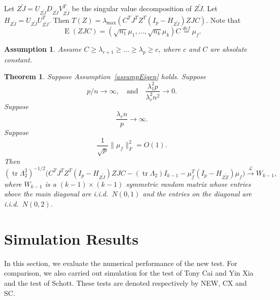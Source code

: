 \documentclass[review]{elsarticle}
\DeclareMathOperator{\mytr}{tr}
\DeclareMathOperator{\myE}{E}
\theoremstyle{plain}
\newtheorem{theorem}{\quad\quad Theorem}
\newtheorem{assumption}{\quad\quad Assumption}
\theoremstyle{definition}
\theoremstyle{remark}
\begin{document}
Let $Z\tilde{J}=U_{Z\tilde{J}}D_{Z\tilde{J}}V_{Z\tilde{J}}^T$ be the singular value decomposition of $Z\tilde{J}$. Let $H_{Z\tilde{J}}=U_{Z\tilde{J}}U_{Z\tilde{J}}^T$.
Then
$T(Z) = \lambda_{\max}(C^T J^T Z^T (I_p-H_{Z\tilde{J}})ZJC)$.
Note that
$$
\myE (ZJC) =(\sqrt{n_1}\mu_1,\ldots,\sqrt{n_k}\mu_k) C\overset{def}{=}\mu_{f}.
$$


\begin{assumption}\label{assumpEigen}
    Assume $C \geq \lambda_{r+1} \geq \ldots \geq \lambda_{p} \geq c$, where $c$ and $C$ are absolute constant.
\end{assumption}







\begin{theorem}\label{thm1}
    Suppose Assumption~\eqref{assumpEigen} holds. Suppose 
    \begin{equation}
    p/n\to \infty,\quad\textrm{and}\quad \frac{\lambda_1^2 p}{\lambda_r^2 n^2}\to 0.
    \end{equation}
    Suppose
    \begin{equation}
        \frac{\lambda_r n}{p}\to \infty.
    \end{equation}
    Suppose
    \begin{equation}
        \frac{1}{\sqrt{p}}\|\mu_f\|_F^2=O(1).
    \end{equation}
    Then
    \begin{equation}
        (\mytr \Lambda_2^2)^{-1/2}\big( C^TJ^T Z^T(I_p-H_{Z\tilde J}) ZJC-(\mytr \Lambda_2) I_{k-1} -\mu_f^T(I_p-H_{Z\tilde Z})\mu_f\big)\xrightarrow{\mathcal{L}} W_{k-1},
    \end{equation}
where $W_{k-1}$ is a $(k-1)\times(k-1)$ symmetric random matrix whose entries above the main diagonal are i.i.d.\ $N(0,1)$ and the entries on the diagonal are i.i.d.\ $N(0,2)$.
\end{theorem}

\section{Simulation Results}

In this section, we evaluate the numerical performance of the new test. For comparison, we also carried out simulation for the test of Tony Cai and Yin Xia and the test of Schott. These tests are denoted respectively by NEW, CX and SC.
\end{document}
